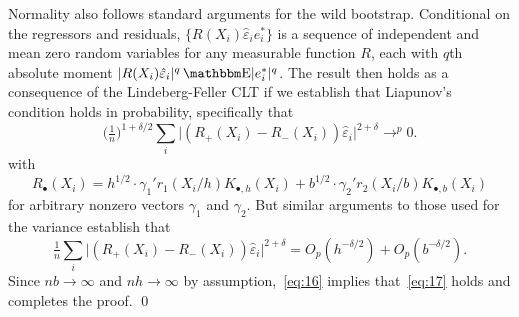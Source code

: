 \documentclass[12pt,fleqn]{article}
\begin{document}
Normality also follows standard arguments for the wild
bootstrap. Conditional on the regressors and residuals,
$\{R(X_i) \hat\varepsilon_i e_i^* \}$ is a sequence of independent and
mean zero random variables for any measurable function $R$, each with
$q$th absolute moment
$\lvert R(X_i) \hat\varepsilon_i \rvert^q \E \lvert e_i^*
\rvert^{q}$.
The result then holds as a consequence of the Lindeberg-Feller CLT if
we establish that Liapunov's condition holds in probability, specifically that
\begin{equation}\label{eq:17}
  \big(\tfrac{1}{n}\big)^{1+\delta/2} \sum_{i} \lvert (R_+(X_i) - R_-(X_i))
  \hat\varepsilon_i \rvert^{2+\delta} \to^{p} 0.
\end{equation}
with
\begin{equation*}
  R_\bullet(X_i) = h^{1/2} \cdot \gamma_1' r_1(X_i/h) K_{\bullet,h}(X_i)
  + b^{1/2} \cdot \gamma_2' r_2(X_i/b) K_{\bullet,b}(X_i)
\end{equation*}
for arbitrary nonzero vectors $\gamma_1$ and $\gamma_2$.
\citep[See, for example,][Proposition 2.27 and Theorem 23.4.]{VDV00}
But similar arguments to those used for the variance establish
that
\begin{equation}\label{eq:16}
  \tfrac{1}{n} \sum_{i} \lvert (R_+(X_i) - R_-(X_i))
  \hat\varepsilon_i \rvert^{2+\delta}
  = O_p(h^{-\delta/2}) + O_p(b^{-\delta/2}).
\end{equation}
Since $nb \to \infty$ and $n h \to \infty$ by
assumption,~\eqref{eq:16} implies that~\eqref{eq:17} holds and
completes the proof. \qed

\clearpage


\end{document}

